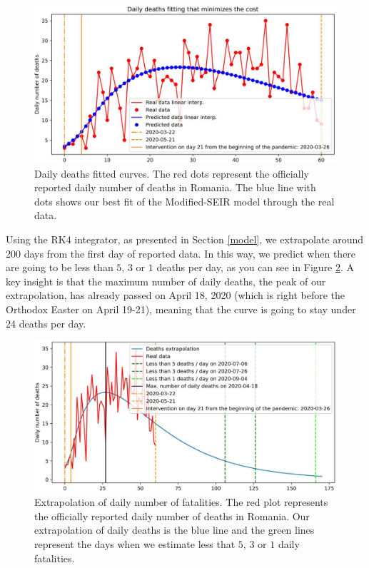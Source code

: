 \documentclass[11pt]{article}
\begin{document}
\begin{figure}[H]
  \centering
  \includegraphics[width=0.8\linewidth]{figs/best_fit/2020-5-21_4_primary_wave-deaths_fitting.pdf}
  \caption{Daily deaths fitted curves. The red dots represent the officially reported daily number of deaths in Romania. The blue line with dots shows our best fit of the Modified-SEIR model through the real data.}
  \label{deaths-fitting}
\end{figure}

Using the RK4 integrator, as presented in Section \ref{model}, we extrapolate around 200 days from the first day of reported data. In this way, we predict when there are going to be less than $5$, $3$ or $1$ deaths per day, as you can see in Figure \ref{deaths-extrapolation}. A key insight is that the maximum number of daily deaths, the peak of our extrapolation, has already passed on April 18, 2020 (which is right before the Orthodox Easter on April 19-21), meaning that the curve is going to stay under 24 deaths per day.

\begin{figure}[H]
  \centering
  \includegraphics[width=0.8\linewidth]{figs/best_fit/2020-5-21_4_primary_wave-deaths_extrapolation.pdf}
  \caption{Extrapolation of daily number of fatalities. The red plot represents the officially reported daily number of deaths in Romania. Our extrapolation of daily deaths is the blue line and the green lines represent the days when we estimate less that $5$, $3$ or $1$ daily fatalities.}
  \label{deaths-extrapolation}
\end{figure}
\end{document}
